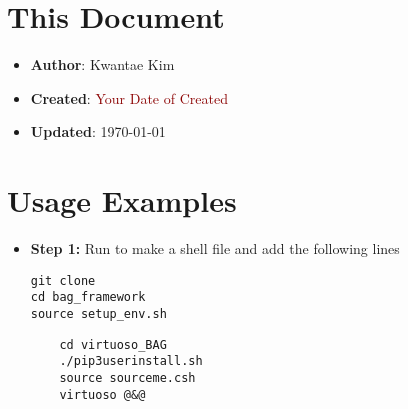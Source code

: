\documentclass[a4paper,12pt]{article}
\begin{document}
\section*{This Document}

\begin{itemize}
    \item \textbf{Author}: Kwantae Kim
    \item \textbf{Created}: \textcolor{darkred}{Your Date of Created}
    \item \textbf{Updated}: \today
\end{itemize}

\tableofcontents

\pagebreak


\section{Usage Examples}

\begin{itemize}
    \item[\footnotesize\faCode] \textbf{Step 1:} Run  to make a shell file and add the following lines
          \vspace{-1em}\begin{verbatim}
git clone
cd bag_framework
source setup_env.sh
        \end{verbatim}
          \vspace{-1em}\begin{verbatim}
    cd virtuoso_BAG
    ./pip3userinstall.sh
    source sourceme.csh
    virtuoso @&@
        \end{verbatim}
\end{itemize}


\label{lastpage}
\end{document}
